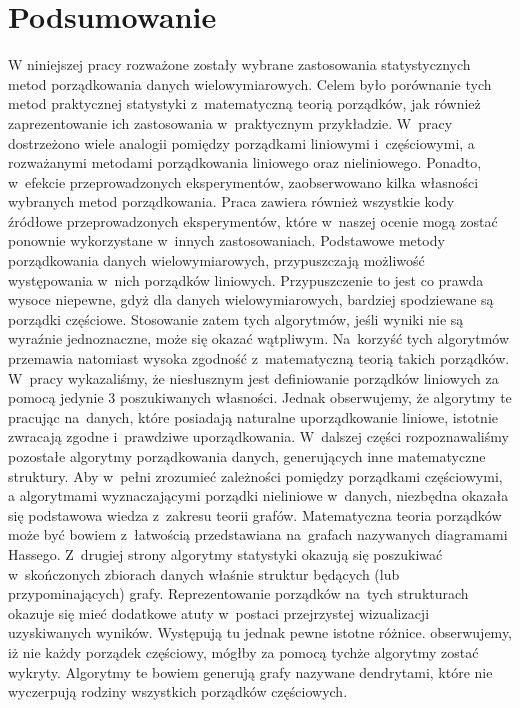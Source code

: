 \documentclass[12pt,a4paper]{report}
\begin{document}
\chapter{Podsumowanie}
W niniejszej pracy rozważone zostały wybrane zastosowania statystycznych metod porządkowania danych wielowymiarowych. Celem było porównanie tych metod praktycznej statystyki z~matematyczną teorią porządków, jak również zaprezentowanie ich zastosowania w~praktycznym przykładzie. W~pracy dostrzeżono wiele analogii pomiędzy porządkami liniowymi i~częściowymi, a rozważanymi metodami porządkowania liniowego oraz nieliniowego. Ponadto, w~efekcie przeprowadzonych eksperymentów, zaobserwowano kilka własności wybranych metod porządkowania. Praca zawiera również wszystkie kody źródłowe przeprowadzonych eksperymentów, które w~naszej ocenie mogą zostać ponownie wykorzystane w~innych zastosowaniach.
Podstawowe metody porządkowania danych wielowymiarowych, przypuszczają możliwość występowania w~nich porządków liniowych. Przypuszczenie to jest co prawda wysoce niepewne, gdyż dla danych wielowymiarowych, bardziej spodziewane są porządki częściowe. Stosowanie zatem tych algorytmów, jeśli wyniki nie są wyraźnie jednoznaczne, może się okazać wątpliwym. Na~korzyść tych algorytmów przemawia natomiast wysoka zgodność z~matematyczną teorią takich porządków. W~pracy wykazaliśmy, że niesłusznym jest definiowanie porządków liniowych za pomocą jedynie 3 poszukiwanych własności. Jednak obserwujemy, że algorytmy te pracując na~danych, które posiadają naturalne uporządkowanie liniowe, istotnie zwracają zgodne i~prawdziwe uporządkowania. W~dalszej części rozpoznawaliśmy pozostałe algorytmy porządkowania danych, generujących inne matematyczne struktury.
Aby w~pełni zrozumieć zależności pomiędzy porządkami częściowymi, a algorytmami wyznaczającymi porządki nieliniowe w~danych, niezbędna okazała się podstawowa wiedza z~zakresu teorii grafów. Matematyczna teoria porządków może być bowiem z~łatwością przedstawiana na~grafach nazywanych diagramami Hassego. Z~drugiej strony algorytmy statystyki okazują się poszukiwać w~skończonych zbiorach danych właśnie struktur będących (lub przypominających) grafy. Reprezentowanie porządków na~tych strukturach okazuje się mieć dodatkowe atuty w~postaci przejrzystej wizualizacji uzyskiwanych wyników. Występują tu jednak pewne istotne różnice. obserwujemy, iż nie każdy porządek częściowy, mógłby za pomocą tychże algorytmy zostać wykryty. Algorytmy te bowiem generują grafy nazywane dendrytami, które nie wyczerpują rodziny wszystkich porządków częściowych.
\end{document}
